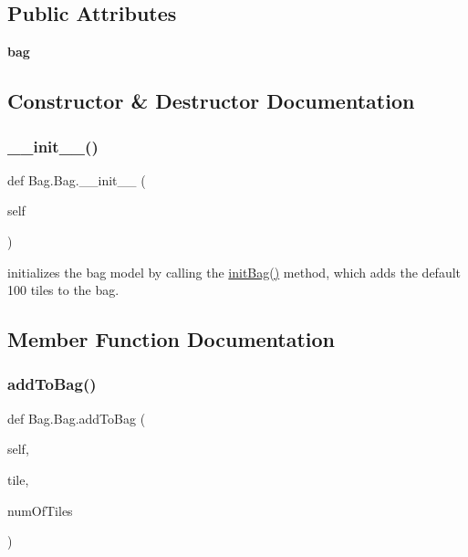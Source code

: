 \subsection*{Public Attributes}
\begin{DoxyCompactItemize}
\item 
\mbox{\label{class_bag_1_1_bag_a20031eba2381537bc52b31c0fd992c1c}} 
{\bfseries bag}
\end{DoxyCompactItemize}


\subsection{Constructor \& Destructor Documentation}
\mbox{\label{class_bag_1_1_bag_aaa334734b2050a511a28537952c68e02}} 
\subsubsection{\texorpdfstring{\+\_\+\+\_\+init\+\_\+\+\_\+()}{\_\_init\_\_()}}
{\footnotesize\ttfamily def Bag.\+Bag.\+\_\+\+\_\+init\+\_\+\+\_\+ (\begin{DoxyParamCaption}\item[{}]{self }\end{DoxyParamCaption})}



initializes the bag model by calling the \hyperlink{class_bag_1_1_bag_ad9b292e02f119061e2a2e7f31eadf074}{init\+Bag()} method, which adds the default 100 tiles to the bag. 



\subsection{Member Function Documentation}
\mbox{\label{class_bag_1_1_bag_afa203e93b2eb94451d16920b318a5e08}} 
\subsubsection{\texorpdfstring{add\+To\+Bag()}{addToBag()}}
{\footnotesize\ttfamily def Bag.\+Bag.\+add\+To\+Bag (\begin{DoxyParamCaption}\item[{}]{self,  }\item[{}]{tile,  }\item[{}]{num\+Of\+Tiles }\end{DoxyParamCaption})}



